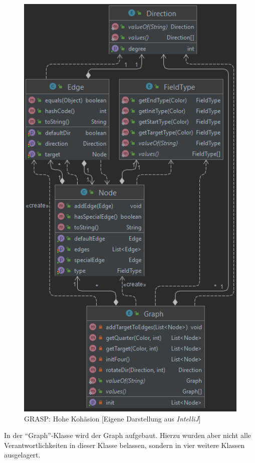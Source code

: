 \begin{figure}[htbp]
\centering
\centerline{\includegraphics[scale=.5]{grasp3}}
\caption{GRASP: Hohe Kohäsion [Eigene Darstellung aus \emph{IntelliJ}]}
\label{fig:grasp3}
\end{figure}

\newpage

\noindent In der \enquote{Graph}-Klasse wird der Graph aufgebaut. Hierzu wurden aber nicht alle Verantwortlichkeiten in dieser Klasse belassen, sondern in vier weitere Klassen ausgelagert.

